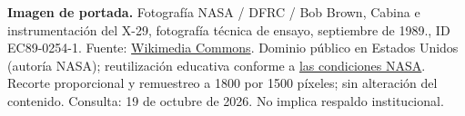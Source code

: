 \noindent\textbf{Imagen de portada.} Fotografía NASA / DFRC / Bob Brown,
Cabina e instrumentación del X-29, fotografía técnica de ensayo, septiembre de 1989., ID EC89-0254-1. Fuente: \href{https://commons.wikimedia.org/wiki/File:Grumman_X-29_Cockpit.jpg}{Wikimedia Commons}.
Dominio público en Estados Unidos (autoría NASA); reutilización educativa conforme a \href{https://www.nasa.gov/nasa-brand-center/images-and-media/}{las condiciones NASA}. Recorte proporcional y remuestreo a 1800 por 1500 píxeles; sin alteración del contenido. Consulta: 19 de octubre de 2026. No implica respaldo institucional.
